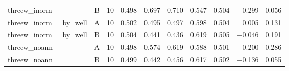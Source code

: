 \begin{tabular}{@{}l c r rrrrrrr@{}}
threew\_inorm & B & 10 & 0.498 & 0.697 & 0.710 & 0.547 & 0.504 & 0.299 & 0.056 \\
threew\_inorm\_\_by\_well & A & 10 & 0.502 & 0.495 & 0.497 & 0.598 & 0.504 & 0.005 & 0.131 \\
threew\_inorm\_\_by\_well & B & 10 & 0.504 & 0.441 & 0.436 & 0.619 & 0.505 & $-$0.046 & 0.191 \\
threew\_noann & A & 10 & 0.498 & 0.574 & 0.619 & 0.588 & 0.501 & 0.200 & 0.286 \\
threew\_noann & B & 10 & 0.499 & 0.442 & 0.456 & 0.617 & 0.502 & $-$0.136 & 0.055 \\
\bottomrule
\end{tabular}
